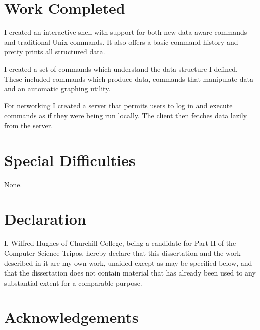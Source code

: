 \documentclass[12pt,twoside,notitlepage]{report}
\begin{document}
\section*{Work Completed}
I created an interactive shell with support for both new data-aware commands and
traditional Unix commands. It also offers a basic command history and pretty
prints all structured data.

I created a set of commands which understand the data structure I defined. These
included commands which produce data, commands that manipulate data and an
automatic graphing utility.

For networking I created a server that permits users to log in and execute
commands as if they were being run locally. The client then fetches data lazily
from the server.

\section*{Special Difficulties}
None.
 
\newpage
\section*{Declaration}

I, Wilfred Hughes of Churchill College, being a candidate for Part II
of the Computer Science Tripos, hereby declare that this dissertation
and the work described in it are my own work, unaided except as may be
specified below, and that the dissertation does not contain material
that has already been used to any substantial extent for a comparable
purpose.

\bigskip
{}

\medskip
{}

\cleardoublepage

\tableofcontents

\listoffigures

\newpage
\section*{Acknowledgements}


\end{document}
